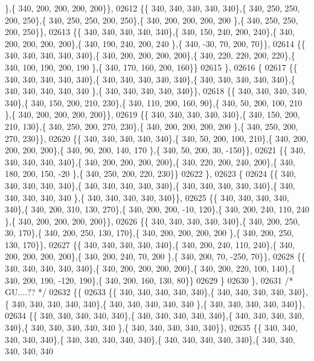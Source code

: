 \begin{DoxyCode}
      \},\{ 340, 200, 200, 200, 200\}\},
02612 \{\{ 340, 340, 340, 340, 340\},\{ 340, 250, 250, 200, 250\},\{ 340, 250, 250, 200, 250\},\{ 340, 200, 200, 200, 200
      \},\{ 340, 250, 250, 200, 250\}\},
02613 \{\{ 340, 340, 340, 340, 340\},\{ 340, 150, 240, 200, 240\},\{ 340, 200, 200, 200, 200\},\{ 340, 190, 240, 200, 240
      \},\{ 340, -30,  70, 200,  70\}\},
02614 \{\{ 340, 340, 340, 340, 340\},\{ 340, 200, 200, 200, 200\},\{ 340, 220, 220, 200, 220\},\{ 340, 100, 190, 200, 190
      \},\{ 340, 170, 160, 200, 160\}\}
02615 \},
02616 \{
02617 \{\{ 340, 340, 340, 340, 340\},\{ 340, 340, 340, 340, 340\},\{ 340, 340, 340, 340, 340\},\{ 340, 340, 340, 340, 340
      \},\{ 340, 340, 340, 340, 340\}\},
02618 \{\{ 340, 340, 340, 340, 340\},\{ 340, 150, 200, 210, 230\},\{ 340, 110, 200, 160,  90\},\{ 340,  50, 200, 100, 210
      \},\{ 340, 200, 200, 200, 200\}\},
02619 \{\{ 340, 340, 340, 340, 340\},\{ 340, 150, 200, 210, 130\},\{ 340, 250, 200, 270, 230\},\{ 340, 200, 200, 200, 200
      \},\{ 340, 250, 200, 270, 230\}\},
02620 \{\{ 340, 340, 340, 340, 340\},\{ 340,  50, 200, 100, 210\},\{ 340, 200, 200, 200, 200\},\{ 340,  90, 200, 140, 170
      \},\{ 340,  50, 200,  30, -150\}\},
02621 \{\{ 340, 340, 340, 340, 340\},\{ 340, 200, 200, 200, 200\},\{ 340, 220, 200, 240, 200\},\{ 340, 180, 200, 150, -20
      \},\{ 340, 250, 200, 220, 230\}\}
02622 \},
02623 \{
02624 \{\{ 340, 340, 340, 340, 340\},\{ 340, 340, 340, 340, 340\},\{ 340, 340, 340, 340, 340\},\{ 340, 340, 340, 340, 340
      \},\{ 340, 340, 340, 340, 340\}\},
02625 \{\{ 340, 340, 340, 340, 340\},\{ 340, 200, 310, 130, 270\},\{ 340, 200, 200, -10, 120\},\{ 340, 200, 240, 110, 240
      \},\{ 340, 200, 200, 200, 200\}\},
02626 \{\{ 340, 340, 340, 340, 340\},\{ 340, 200, 250,  30, 170\},\{ 340, 200, 250, 130, 170\},\{ 340, 200, 200, 200, 200
      \},\{ 340, 200, 250, 130, 170\}\},
02627 \{\{ 340, 340, 340, 340, 340\},\{ 340, 200, 240, 110, 240\},\{ 340, 200, 200, 200, 200\},\{ 340, 200, 240,  70, 200
      \},\{ 340, 200,  70, -250,  70\}\},
02628 \{\{ 340, 340, 340, 340, 340\},\{ 340, 200, 200, 200, 200\},\{ 340, 200, 220, 100, 140\},\{ 340, 200, 190, -120, 
      190\},\{ 340, 200, 160, 130,  80\}\}
02629 \}
02630 \},
02631 \textcolor{comment}{/* GU....?? */}
02632 \{\{
02633 \{\{ 340, 340, 340, 340, 340\},\{ 340, 340, 340, 340, 340\},\{ 340, 340, 340, 340, 340\},\{ 340, 340, 340, 340, 340
      \},\{ 340, 340, 340, 340, 340\}\},
02634 \{\{ 340, 340, 340, 340, 340\},\{ 340, 340, 340, 340, 340\},\{ 340, 340, 340, 340, 340\},\{ 340, 340, 340, 340, 340
      \},\{ 340, 340, 340, 340, 340\}\},
02635 \{\{ 340, 340, 340, 340, 340\},\{ 340, 340, 340, 340, 340\},\{ 340, 340, 340, 340, 340\},\{ 340, 340, 340, 340, 340

\end{DoxyCode}
